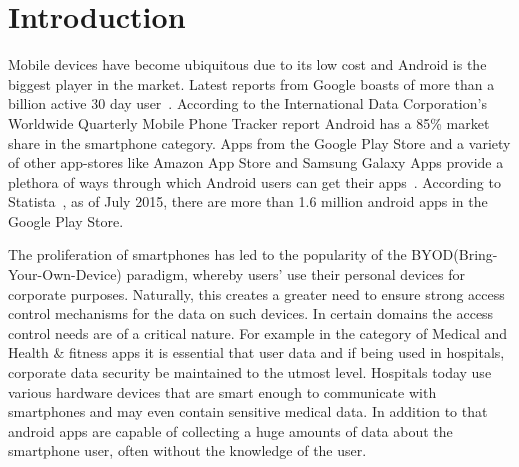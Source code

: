 \section{Introduction}
\label{intro}
Mobile devices have become ubiquitous due to its low cost and Android is the biggest player in the market. Latest reports from Google boasts of more than a billion active 30 day user~\cite{Engadget_market_share}. According to the International Data Corporation's Worldwide Quarterly Mobile Phone Tracker report Android has a 85\% market share in the smartphone category. Apps from the Google Play Store and a variety of other app-stores like Amazon App Store and Samsung Galaxy Apps provide a plethora of ways through which Android users can get their apps~\cite{Online_App_Stores}. According to Statista~\cite{Android_app_number}, as of July 2015, there are more than 1.6 million android apps in the Google Play Store. 

The proliferation of smartphones has led to the popularity of the BYOD(Bring-Your-Own-Device) paradigm, whereby users' use their personal devices for corporate purposes. Naturally, this creates a greater need to ensure strong access control mechanisms for the data on such devices. In certain domains the access control needs are of a critical nature. For example in the category of Medical and Health \& fitness apps it is essential that user data and if being used in hospitals, corporate data security be maintained to the utmost level. Hospitals today use various hardware devices that are smart enough to communicate with smartphones and may even contain sensitive medical data. In addition to that android apps are capable of collecting a huge amounts of data about the smartphone user, often without the knowledge of the user. 

